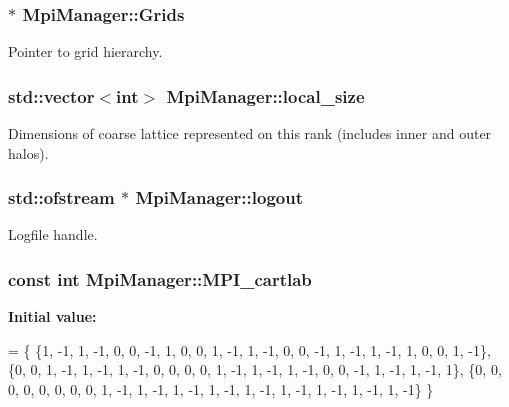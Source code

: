 \subsubsection[{\texorpdfstring{Grids}{Grids}}]{ $\ast$ Mpi\+Manager\+::\+Grids\hspace{0.3cm}{\ttfamily [static]}}\hypertarget{class_mpi_manager_a1520da6b8a663cba25a1a9822dd81543}{}\label{class_mpi_manager_a1520da6b8a663cba25a1a9822dd81543}


Pointer to grid hierarchy. 

\subsubsection[{\texorpdfstring{local\+\_\+size}{local_size}}]{\setlength{\rightskip}{0pt plus 5cm}std\+::vector$<$int$>$ Mpi\+Manager\+::local\+\_\+size}\hypertarget{class_mpi_manager_ad4a918a4cd19e644ff3295b2854fc6af}{}\label{class_mpi_manager_ad4a918a4cd19e644ff3295b2854fc6af}


Dimensions of coarse lattice represented on this rank (includes inner and outer halos). 

\subsubsection[{\texorpdfstring{logout}{logout}}]{\setlength{\rightskip}{0pt plus 5cm}std\+::ofstream $\ast$ Mpi\+Manager\+::logout\hspace{0.3cm}{\ttfamily [static]}}\hypertarget{class_mpi_manager_afbd3a2866235c1d4a32e6806318061fd}{}\label{class_mpi_manager_afbd3a2866235c1d4a32e6806318061fd}


Logfile handle. 

\subsubsection[{\texorpdfstring{M\+P\+I\+\_\+cartlab}{MPI_cartlab}}]{\setlength{\rightskip}{0pt plus 5cm}const int Mpi\+Manager\+::\+M\+P\+I\+\_\+cartlab\hspace{0.3cm}{\ttfamily [static]}}\hypertarget{class_mpi_manager_a2c3010f87e6a8a6c65e6f975e37fb7d5}{}\label{class_mpi_manager_a2c3010f87e6a8a6c65e6f975e37fb7d5}
{\bfseries Initial value\+:}
\begin{DoxyCode}
=
    \{
        \{1, -1,  1, -1,  0,  0, -1,  1,     0,  0,      1, -1,  1, -1,  0,  0, -1,  1, -1,  1, -1,  1,  0, 
       0,  1, -1\},
        \{0,  0,  1, -1,  1, -1,  1, -1,     0,  0,      0,  0,  1, -1,  1, -1,  1, -1,  0,  0, -1,  1, -1, 
       1, -1,  1\},
        \{0,  0,  0,  0,  0,  0,  0,  0,     1, -1,      1, -1,  1, -1,  1, -1,  1, -1,  1, -1,  1, -1,  1, 
      -1,  1, -1\}
    \}
\end{DoxyCode}


